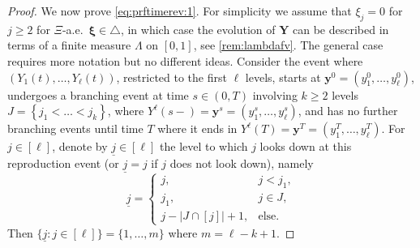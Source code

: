 \documentclass[reqno,draft]{amsart}
\numberwithin{equation}{section}
\theoremstyle{plain}
\theoremstyle{remark}
\begin{document}
\begin{proof}
    We now prove \cref{eq:prftimerev:1}. For simplicity we assume that $\xi_j = 0$ for $j\ge 2$ for $\Xi$-a.e.\ $\boldsymbol \xi \in \triangle$, in which case the evolution of $\boldsymbol Y$ can be described in terms of a finite measure $\Lambda$ on $[0,1]$, see \cref{rem:lambdafv}. The general case requires more notation but no different ideas. Consider the event where $(Y_1(t), \ldots ,Y_\ell(t))$, restricted to the first $\ell$ levels, starts at $\boldsymbol y^0 = (y^0_1, \ldots ,y^0_\ell)$, undergoes a branching event at time $s\in (0,T)$ involving $k \ge 2$ levels $J = \left\{ j_1<\ldots <j_k \right\} $, where $Y^\ell(s-) = \boldsymbol y^s = (y^s_1, \ldots ,y^s_\ell)$, and has no further branching events until time $T$ where it ends in $Y^\ell(T) = \boldsymbol y^T = (y^T_1, \ldots ,y^T_\ell)$. For $j\in [\ell]$, denote by $\underline{j}\in [\ell]$ the level to which $j$ looks down at this reproduction event (or $\underline{j} = j$ if $j$ does not look down), namely \[
        \underline{j} =
        \begin{cases}
            j, & j < j_1,\\
            j_1, & j\in J,\\
            j - |J \cap [j]| + 1, & \text{else}.
        \end{cases}
    \] Then $\{\underline{j}\colon j\in [\ell]\} = \{1,\ldots,m\}$ where $m = \ell - k+1$.


\end{proof}
\end{document}

